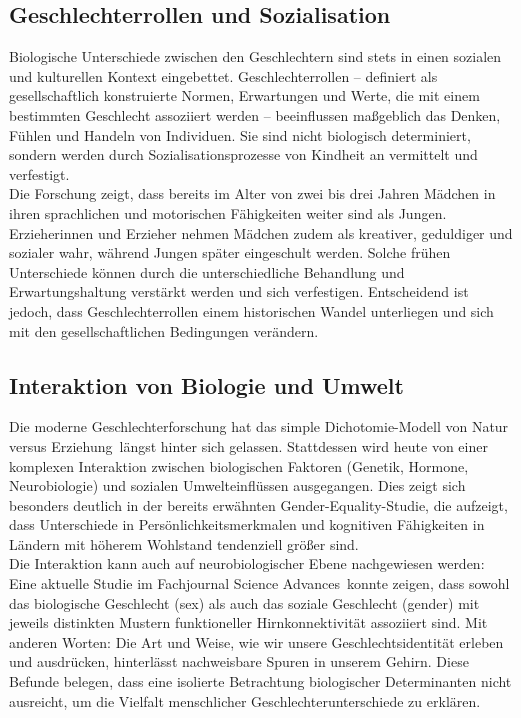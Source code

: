 \documentclass[12pt,a4paper]{article}
\begin{document}
	\subsection{Geschlechterrollen und Sozialisation}
	Biologische Unterschiede zwischen den Geschlechtern sind stets in einen sozialen und kulturellen Kontext eingebettet. Geschlechterrollen -- definiert als gesellschaftlich konstruierte Normen, Erwartungen und Werte, die mit einem bestimmten Geschlecht assoziiert werden -- beeinflussen maßgeblich das Denken, Fühlen und Handeln von Individuen. \cite{HLS2024} Sie sind nicht biologisch determiniert, sondern werden durch Sozialisationsprozesse von Kindheit an vermittelt und verfestigt. \cite{FES2024}\\
	Die Forschung zeigt, dass bereits im Alter von zwei bis drei Jahren Mädchen in ihren sprachlichen und motorischen Fähigkeiten weiter sind als Jungen. \cite{Zeit2024} Erzieherinnen und Erzieher nehmen Mädchen zudem als kreativer, geduldiger und sozialer wahr, während Jungen später eingeschult werden. Solche frühen Unterschiede können durch die unterschiedliche Behandlung und Erwartungshaltung verstärkt werden und sich verfestigen. Entscheidend ist jedoch, dass Geschlechterrollen einem historischen Wandel unterliegen und sich mit den gesellschaftlichen Bedingungen verändern. \cite{DIW2025}
	
	\subsection{Interaktion von Biologie und Umwelt}
	Die moderne Geschlechterforschung hat das simple Dichotomie-Modell von \glqq Natur versus Erziehung\grqq\ längst hinter sich gelassen. Stattdessen wird heute von einer komplexen Interaktion zwischen biologischen Faktoren (Genetik, Hormone, Neurobiologie) und sozialen Umwelteinflüssen ausgegangen. \cite{Asendorpf2015} Dies zeigt sich besonders deutlich in der bereits erwähnten Gender-Equality-Studie, die aufzeigt, dass Unterschiede in Persönlichkeitsmerkmalen und kognitiven Fähigkeiten in Ländern mit höherem Wohlstand tendenziell größer sind. \cite{Herlitz2025}\\
	Die Interaktion kann auch auf neurobiologischer Ebene nachgewiesen werden: Eine aktuelle Studie im Fachjournal \glqq Science Advances\grqq\ konnte zeigen, dass sowohl das biologische Geschlecht (sex) als auch das soziale Geschlecht (gender) mit jeweils distinkten Mustern funktioneller Hirnkonnektivität assoziiert sind. \cite{Science2024} Mit anderen Worten: Die Art und Weise, wie wir unsere Geschlechtsidentität erleben und ausdrücken, hinterlässt nachweisbare Spuren in unserem Gehirn. Diese Befunde belegen, dass eine isolierte Betrachtung biologischer Determinanten nicht ausreicht, um die Vielfalt menschlicher Geschlechterunterschiede zu erklären.
	
\end{document}
